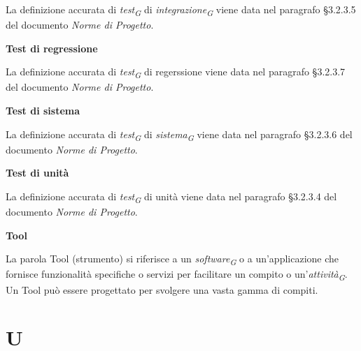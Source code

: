 \documentclass{article}
\begin{document}
La definizione accurata di \textit{test}\textsubscript{\textit{G}} di \textit{integrazione}\textsubscript{\textit{G}} viene data nel paragrafo §3.2.3.5 del documento \textit{Norme di Progetto}.

\vspace{0.4cm}

\textbf{Test di regressione}

\vspace{0.1cm}

La definizione accurata di \textit{test}\textsubscript{\textit{G}} di regerssione viene data nel paragrafo §3.2.3.7 del documento \textit{Norme di Progetto}.

\vspace{0.4cm}

\textbf{Test di sistema} 

\vspace{0.1cm}

La definizione accurata di \textit{test}\textsubscript{\textit{G}} di \textit{sistema}\textsubscript{\textit{G}} viene data nel paragrafo §3.2.3.6 del documento \textit{Norme di Progetto}.

\vspace{0.4cm}

\textbf{Test di unità}

\vspace{0.1cm}

La definizione accurata di \textit{test}\textsubscript{\textit{G}} di unità viene data nel paragrafo §3.2.3.4 del documento \textit{Norme di Progetto}.

\vspace{0.4cm}

\textbf{Tool}

\vspace{0.1cm}

La parola Tool (strumento) si riferisce a un \textit{software}\textsubscript{\textit{G}} o a un'applicazione che fornisce funzionalità specifiche o servizi per facilitare un compito o un'\textit{attività}\textsubscript{\textit{G}}. Un Tool può essere progettato per svolgere una vasta gamma di compiti.

\pagebreak
\section*{U}
{}

\vspace{0.4cm}
\end{document}
